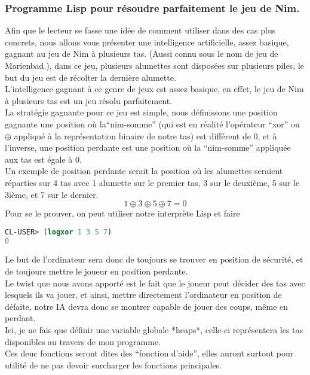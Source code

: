 \documentclass[a4paper, 12pt]{article}
\numberwithin{equation}{subsection}
\begin{document}
\subsubsection{Programme Lisp pour résoudre parfaitement le jeu de Nim.}
Afin que le lecteur se fasse une idée de comment utiliser dans des cas plus concrets, nous allons vous présenter une intelligence artificielle, assez basique, gagnant au jeu de Nim à plusieurs tas. (Aussi connu sous le nom de jeu de Marienbad.), dans ce jeu, plusieurs alumettes sont disposées sur plusieurs piles, le but du jeu est de récolter la dernière alumette. \\
L'intelligence gagnant à ce genre de jeux est assez basique, en effet, le jeu de Nim à plusieurs tas est un jeu résolu parfaitement. \\
La stratégie gagnante pour ce jeu est simple, nous définissons une position gagnante une position où la``nim-somme'' (qui est en réalité l'opérateur ``xor'' ou $\oplus$ appliqué à la représentation binaire de notre tas) est différent de 0, et à l'inverse, une position perdante est une position où la ``nim-somme'' appliquée aux tas est égale à 0. \\
Un exemple de position perdante serait la position où les alumettes seraient réparties sur 4 tas avec 1 alumette sur le premier tas, 3 sur le deuxième, 5 sur le 3ième, et 7 sur le dernier. \\
$$1 \oplus 3 \oplus 5 \oplus 7 = 0$$
Pour se le prouver, on peut utiliser notre interprète Lisp et faire
\begin{lstlisting}[language=Lisp]
CL-USER> (logxor 1 3 5 7)
0
\end{lstlisting}
Le but de l'ordinateur sera donc de toujours se trouver en position de sécurité, et de toujours mettre le joueur en position perdante. \\
Le twist que nous avons apporté est le fait que le joueur peut décider des tas avec lesquels ils va jouer, et ainsi, mettre directement l'ordinateur en position de défaite, notre IA devra donc se montrer capable de jouer des coups, même en perdant. \\

Ici, je ne fais que définir une variable globale *heaps*, celle-ci représentera les tas disponibles au travers de mon programme. \\

Ces deuc fonctions seront dites des ``fonction d'aide'', elles auront surtout pour utilité de ne pas devoir surcharger les fonctions principales. \\
\end{document}
